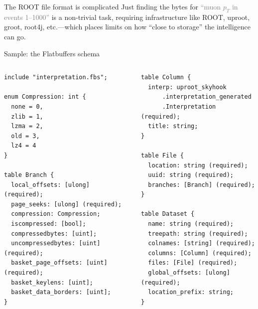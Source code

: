 \documentclass[aspectratio=169]{beamer}
\begin{document}
\begin{frame}{The ROOT file format is complicated}
\large
\vspace{0.5 cm}
Just finding the bytes for \textcolor{gray}{``muon $p_T$ in events 1--1000''} is a non-trivial task, requiring infrastructure like ROOT, uproot, groot, root4j, etc.---which places limits on how ``close to storage'' the intelligence can go.

\vspace{0.5 cm}

\vspace{0.5 cm}
\end{frame}

\begin{frame}[fragile]{Sample: the Flatbuffers schema}
\scriptsize
\begin{columns}[t]
\begin{verbatim}
include "interpretation.fbs";

enum Compression: int {
  none = 0,
  zlib = 1,
  lzma = 2,
  old = 3,
  lz4 = 4
}

table Branch {
  local_offsets: [ulong] (required);
  page_seeks: [ulong] (required);
  compression: Compression;
  iscompressed: [bool];
  compressedbytes: [uint];
  uncompressedbytes: [uint] (required);
  basket_page_offsets: [uint] (required);
  basket_keylens: [uint];
  basket_data_borders: [uint];
}
\end{verbatim}

\begin{verbatim}
table Column {
  interp: uproot_skyhook
      .interpretation_generated
      .Interpretation (required);
  title: string;
}

table File {
  location: string (required);
  uuid: string (required);
  branches: [Branch] (required);
}

table Dataset {
  name: string (required);
  treepath: string (required);
  colnames: [string] (required);
  columns: [Column] (required);
  files: [File] (required);
  global_offsets: [ulong] (required);
  location_prefix: string;
}
\end{verbatim}

\end{columns}
\end{frame}
\end{document}
